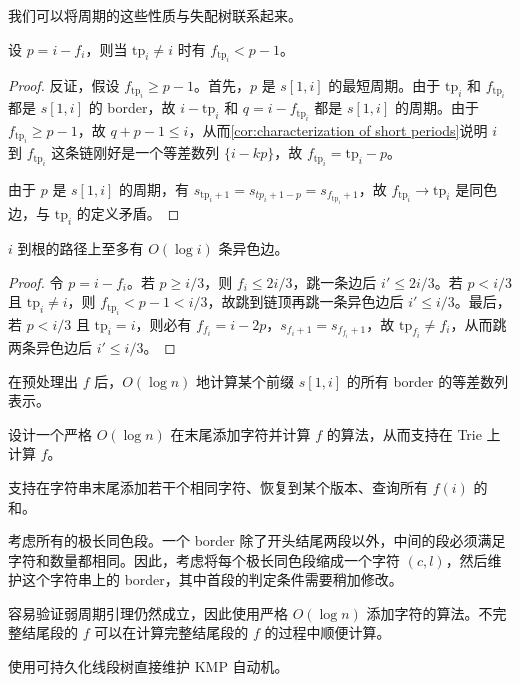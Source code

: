 我们可以将周期的这些性质与失配树联系起来。
\begin{lemma}
    设 $p=i-f_i$，则当 $\mathrm{tp}_i\ne i$ 时有 $f_{\mathrm{tp}_i}<p-1$。
\end{lemma}
\begin{proof}
    反证，假设 $f_{\mathrm{tp}_i}\ge p-1$。首先，$p$ 是 $s[1,i]$ 的最短周期。由于 $\mathrm{tp}_i$ 和 $f_{\mathrm{tp}_i}$ 都是 $s[1,i]$ 的 border，故 $i-\mathrm{tp}_i$ 和 $q=i-f_{\mathrm{tp}_i}$ 都是 $s[1,i]$ 的周期。由于 $f_{\mathrm{tp}_i}\ge p-1$，故 $q+p-1\le i$，从而\cref{cor:characterization of short periods}说明 $i$ 到 $f_{\mathrm{tp}_i}$ 这条链刚好是一个等差数列 $\{i-kp\}$，故 $f_{\mathrm{tp}_i}=\mathrm{tp}_i-p$。

    由于 $p$ 是 $s[1,i]$ 的周期，有 $s_{\mathrm{tp}_i+1}=s_{tp_i+1-p}=s_{f_{\mathrm{tp}_i}+1}$，故 $f_{\mathrm{tp}_i}\to \mathrm{tp}_i$ 是同色边，与 $\mathrm{tp}_i$ 的定义矛盾。
\end{proof}
\begin{corollary}
    $i$ 到根的路径上至多有 $O(\log i)$ 条异色边。
\end{corollary}
\begin{proof}
    令 $p=i-f_i$。若 $p\ge i/3$，则 $f_i\le 2i/3$，跳一条边后 $i'\le 2i/3$。若 $p<i/3$ 且 $\mathrm{tp}_i\ne i$，则 $f_{\mathrm{tp}_i}<p-1<i/3$，故跳到链顶再跳一条异色边后 $i'\le i/3$。最后，若 $p<i/3$ 且 $\mathrm{tp}_i=i$，则必有 $f_{f_i}=i-2p$，$s_{f_i+1}=s_{f_{f_i}+1}$，故 $\mathrm{tp}_{f_i}\ne f_i$，从而跳两条异色边后 $i'\le i/3$。
\end{proof}

\begin{exercise}
    在预处理出 $f$ 后，$O(\log n)$ 地计算某个前缀 $s[1,i]$ 的所有 border 的等差数列表示。    
\end{exercise}

\begin{exercise}
    设计一个严格 $O(\log n)$ 在末尾添加字符并计算 $f$ 的算法，从而支持在 Trie 上计算 $f$。
\end{exercise}

\begin{exercise}[P5287]
    支持在字符串末尾添加若干个相同字符、恢复到某个版本、查询所有 $f(i)$ 的和。
\end{exercise}
\begin{solution}
    考虑所有的极长同色段。一个 border 除了开头结尾两段以外，中间的段必须满足字符和数量都相同。因此，考虑将每个极长同色段缩成一个字符 $(c,l)$，然后维护这个字符串上的 border，其中首段的判定条件需要稍加修改。 
    
    容易验证弱周期引理仍然成立，因此使用严格 $O(\log n)$ 添加字符的算法。不完整结尾段的 $f$ 可以在计算完整结尾段的 $f$ 的过程中顺便计算。
\end{solution}
\begin{solution}[另解]
    使用可持久化线段树直接维护 KMP 自动机。
\end{solution}

